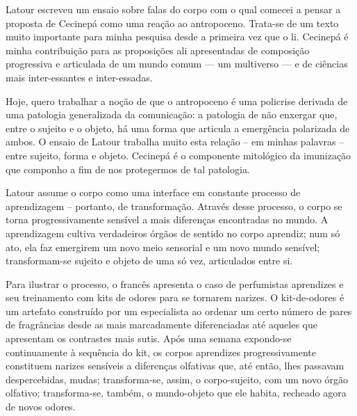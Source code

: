 Latour escreveu um ensaio sobre falas do corpo com o qual comecei a pensar a proposta de Cecinepá como uma reação ao antropoceno. Trata-se de um texto muito importante para minha pesquisa desde a primeira vez que o li. Cecinepá é minha contribuição para as proposições ali apresentadas de composição progressiva e articulada de um mundo comum --- um multiverso --- e de ciências mais inter-essantes e inter-essadas.

Hoje, quero trabalhar a noção de que o antropoceno é uma policrise derivada de uma patologia generalizada da comunicação: a patologia de não enxergar que, entre o sujeito e o objeto, há uma forma que articula a emergência polarizada de ambos. O ensaio de Latour trabalha muito esta relação -- em minhas palavras -- entre sujeito, forma e objeto. Cecinepá é o componente mitológico da imunização que componho a fim de nos protegermos de tal patologia.

Latour assume o corpo como uma interface em constante processo de aprendizagem -- portanto, de transformação. Através desse processo, o corpo se torna progressivamente sensível a mais diferenças encontradas no mundo. A aprendizagem cultiva verdadeiros órgãos de sentido no corpo aprendiz; num só ato, ela faz emergirem um novo meio sensorial e um novo mundo sensível; transformam-se sujeito e objeto de uma só vez, articulados entre si.

Para ilustrar o processo, o francês apresenta o caso de perfumistas aprendizes e seu treinamento com kits de odores para se tornarem narizes. O kit-de-odores é um artefato construído por um especialista ao ordenar um certo número de pares de fragrâncias desde as mais marcadamente diferenciadas até aqueles que apresentam os contrastes mais sutis. Após uma semana expondo-se continuamente à sequência do kit, os corpos aprendizes progressivamente constituem narizes sensíveis a diferenças olfativas que, até então, lhes passavam despercebidas, mudas; transforma-se, assim, o corpo-sujeito, com um novo órgão olfativo; transforma-se, também, o mundo-objeto que ele habita, recheado agora de novos odores.

